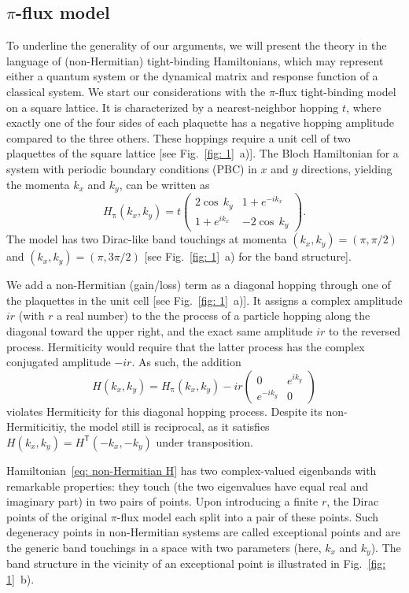 \subsection{$\pi$-flux model}
To underline the generality of our arguments, we will present the
theory in the language of (non-Hermitian) tight-binding Hamiltonians,
which may represent either a quantum system or the dynamical matrix and response function of a classical system. We start our considerations with the $\pi$-flux tight-binding model on a square lattice. It is characterized by a nearest-neighbor hopping $t$, where exactly one of the four sides of each plaquette has a negative hopping amplitude compared to the three others. These hoppings require a unit cell of two plaquettes of the square lattice [see Fig.~\ref{fig: 1}~a)]. The Bloch Hamiltonian for a system with periodic boundary conditions (PBC) in $x$ and $y$ directions, yielding the momenta $k_x$ and $k_y$, can be written as
\begin{equation}
H_{\mathrm{\pi}}(k_x,k_y)=
t\begin{pmatrix}
2\cos\,k_y&1+e^{-ik_x}\\
1+e^{ik_x}&-2\cos\,k_y
\end{pmatrix}.
\label{eq: pi flux}
\end{equation}
The model has two Dirac-like band touchings at momenta $(k_x,k_y)=(\pi,\pi/2)$ and $(k_x,k_y)=(\pi,3\pi/2)$ [see Fig.~\ref{fig: 1}~a) for the band structure].

We add a non-Hermitian (gain/loss) term as a diagonal hopping through
one of the plaquettes in the unit cell [see Fig.~\ref{fig: 1}~a)]. It
assigns a complex amplitude $i r$ (with $r$ a real number) to
the the process of a particle hopping along the diagonal toward the
upper right, and the exact same amplitude $i r$ to the
reversed process. Hermiticity would require that the latter
process has the complex conjugated amplitude $-i r$. As such, the addition 
\begin{equation}
H(k_x,k_y)=
H_{\mathrm{\pi}}(k_x,k_y)
-ir \begin{pmatrix}
0&e^{ik_y}\\
e^{-ik_y}&0
\end{pmatrix}
\label{eq: non-Hermitian H}
\end{equation}
violates Hermiticity for this diagonal hopping process.
Despite its non-Hermiticitiy, the model still is reciprocal, as it satisfies
$H(k_x,k_y)=H^{\mathsf{T}}(-k_x,-k_y)$ under transposition. 

Hamiltonian~\eqref{eq: non-Hermitian H} has two complex-valued eigenbands with remarkable properties: they  touch (\ie the two eigenvalues have equal real and imaginary part) in two pairs of points. Upon introducing a finite $r$, the Dirac points of the original $\pi$-flux model each split into a pair of these points. Such degeneracy points in non-Hermitian systems are called exceptional points and are the generic band touchings in a space with two parameters (here, $k_x$ and $k_y$). The band structure in the vicinity of an exceptional point is illustrated in Fig.~\ref{fig: 1}~b).

